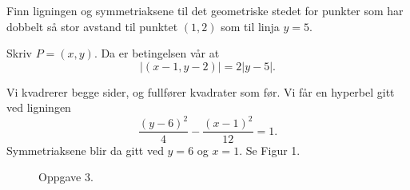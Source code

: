 \documentclass[11pt, norsk]{article}
\begin{document}
\begin{oppg}
Finn ligningen og symmetriaksene til det geometriske stedet for punkter som har dobbelt så stor avstand til punktet $(1,2)$ som til linja $y=5$.
\end{oppg}
\begin{losn}
Skriv $P=(x,y)$. Da er betingelsen vår at $$\lvert (x-1,y-2) \rvert = 2 \lvert y - 5 \rvert.$$

Vi kvadrerer begge sider, og fullfører kvadrater som før. Vi får en hyperbel gitt ved ligningen
$$
\frac{\left( y- 6 \right)^2}{4} - \frac{\left(x-1\right)^2}{12} = 1.
$$
Symmetriaksene blir da gitt ved $y=6$ og $x=1$. Se Figur 1.
\begin{figure}
\caption{Oppgave 3.}
\end{figure}
\end{losn}
\end{document}
